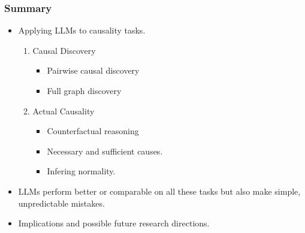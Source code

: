 \documentclass{beamer}
\begin{document}
\begin{frame}
	\frametitle{Summary}
	\begin{itemize}
		\item Applying LLMs to causality tasks.
		\begin{enumerate}
			\item Causal Discovery
				\begin{itemize}
					\item Pairwise causal discovery
					\item Full graph discovery
				\end{itemize}
			\item Actual Causality
				\begin{itemize}
					\item Counterfactual reasoning
					\item Necessary and sufficient causes.
					\item Infering normality.
				\end{itemize}
		\end{enumerate}
		\item LLMs perform better or comparable on all these tasks but also make simple, unpredictable mistakes.
		\item Implications and possible future research directions.
	\end{itemize}
\end{frame}
\end{document}
